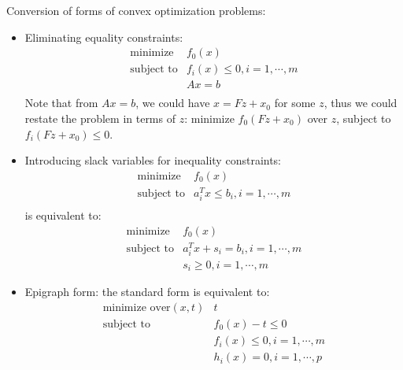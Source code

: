 \documentclass{report}
\begin{document}
Conversion of forms of convex optimization problems: 
\begin{itemize}
\item Eliminating equality constraints: 
\begin{equation}
\begin{array}{ll}
\text{minimize} & f_0(x) \\
\text{subject to} & f_i(x) \leq 0, i = 1, \cdots, m\\
 & Ax = b\\
\end{array}
\end{equation}
Note that from $Ax = b$, we could have $x = Fz + x_0$ for some $z$, thus we could restate the problem in terms of $z$: minimize $f_0(Fz + x_0)$ over $z$, subject to $f_i(Fz + x_0) \leq 0$. 

\item Introducing slack variables for inequality constraints: 
\begin{equation}
\begin{array}{ll}
\text{minimize} & f_0(x) \\
\text{subject to} & a_i^T x \leq b_i, i = 1, \cdots, m\\
\end{array}
\end{equation}
is equivalent to: 
\begin{equation}
\begin{array}{ll}
\text{minimize} & f_0(x) \\
\text{subject to} & a_i^T x + s_i = b_i, i = 1, \cdots, m\\
 & s_i \geq 0, i = 1, \cdots, m
\end{array}
\end{equation}

\item Epigraph form: the standard form is equivalent to: 
\begin{equation}
\begin{array}{ll}
\text{minimize over} (x,t) & t \\
\text{subject to} & f_0(x) - t \leq 0\\
 & f_i(x) \leq 0, i = 1, \cdots, m\\
 & h_i(x) = 0, i = 1, \cdots, p\\
\end{array}
\end{equation}


\end{itemize}
\end{document}
